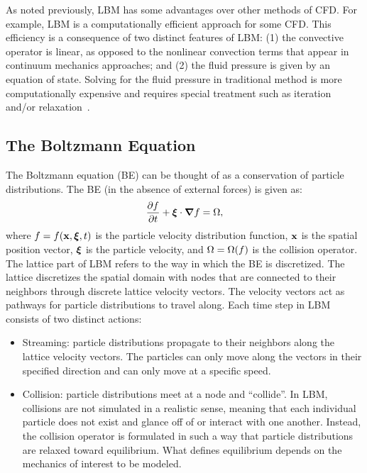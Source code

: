 As noted previously, LBM has some advantages over other methods of CFD.
For example, LBM is a computationally efficient approach for some CFD.
This efficiency is a consequence of two distinct features of LBM: (1) the convective operator is linear, as opposed to the nonlinear convection terms that appear in continuum mechanics approaches; and (2) the fluid pressure is given by an equation of state.
Solving for the fluid pressure in traditional method is more computationally expensive and requires special treatment such as iteration and/or relaxation~\cite{chen1998lattice}.

\subsection{The Boltzmann Equation}
The Boltzmann equation (BE) can be thought of as a conservation of particle distributions.
The BE (in the absence of external forces) is given as:
\begin{equation}
\frac{\partial f}{\partial t} + \boldsymbol{\xi} \cdot \boldsymbol{\nabla} f = \Omega,
\end{equation}
\noindent where $f = f(\mathbf{x}, \boldsymbol{\xi}, t)$ is the particle velocity distribution function, $\mathbf{x}$ is the spatial position vector, $\boldsymbol{\xi}$ is the particle velocity, and $\Omega = \Omega(f)$ is the collision operator.
The lattice part of LBM refers to the way in which the BE is discretized.
The lattice discretizes the spatial domain with nodes that are connected to their neighbors through discrete lattice velocity vectors.
The velocity vectors act as pathways for particle distributions to travel along.
Each time step in LBM consists of two distinct actions:

\begin{itemize}
\item Streaming: particle distributions propagate to their neighbors along the lattice velocity vectors.
The particles can only move along the vectors in their specified direction and can only move at a specific speed.
\item Collision: particle distributions meet at a node and ``collide''.
In LBM, collisions are not simulated in a realistic sense, meaning that each individual particle does not exist and glance off of or interact with one another.
Instead, the collision operator is formulated in such a way that particle distributions are relaxed toward equilibrium.
What defines equilibrium depends on the mechanics of interest to be modeled.
\end{itemize}

